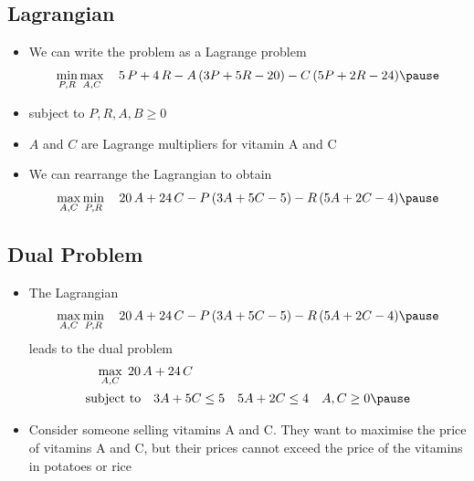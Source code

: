 
\begin{slide}
\section{Lagrangian}

\begin{PauseHighLight}
  \begin{itemize}
  \item We can write the problem as a Lagrange problem
    \begin{align*}
      \min_{P,R} \max_{A,C} \quad 5\,P + 4\,R - A\,(3 P + 5 R - 20)
      - C \, (5 P + 2 R - 24)\pause
    \end{align*}
  \item subject to $P,R,A,B \geq 0$\pause
  \item $A$ and $C$ are Lagrange multipliers for vitamin A and C\pause
  \item We can rearrange the Lagrangian to obtain
    \begin{align*}
      \max_{A,C} \min_{P,R} \quad 20\, A + 24\, C - P \, (3 A + 5 C - 5)
      - R \, (5 A + 2 C - 4)\pause
    \end{align*}
  \end{itemize}
\end{PauseHighLight}

\end{slide}



\begin{slide}
\section{Dual Problem}

\begin{PauseHighLight}
  \begin{itemize}
  \item The Lagrangian
    \begin{align*}
      \max_{A,C} \min_{P,R} \quad 20\, A + 24\, C - P \, (3 A + 5 C - 5)
      - R \, (5 A + 2 C - 4)\pause
    \end{align*}
    leads to the dual problem
    \begin{align*}
      \max_{A,C}\; 20\, A + 24\, C \hspace{6cm} \\
      \text{subject to} \quad 3 A + 5 C \leq 5 \quad 5 A + 2 C \leq 4
      \quad A, C \geq 0\pause
    \end{align*}
  \item Consider someone selling vitamins A and C.  They want
    to maximise the price of vitamins A and C, but their prices cannot
    exceed the price of the vitamins in potatoes or rice\pause
  \end{itemize}
\end{PauseHighLight}

\end{slide}

